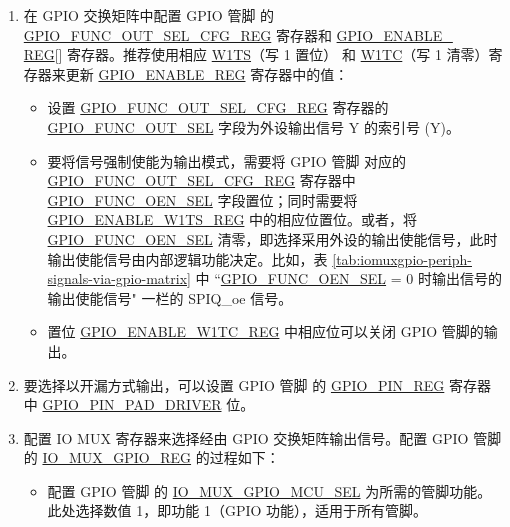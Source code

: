 \documentclass[main\_\_CN.tex]{subfiles}
\begin{document}
\begin{enumerate}
    \item 在 GPIO 交换矩阵中配置 GPIO 管脚  的 \hyperref[regdesc:GPIOFUNCNOUTSELCFGREG]{GPIO\_FUNC\_OUT\_SEL\_CFG\_REG} 寄存器和 \hyperref[regdesc:GPIOENABLEREG]{GPIO\_ENABLE\_\\REG}[] 寄存器。推荐使用相应 \hyperref[regdesc:GPIOENABLEW1TSREG]{W1TS}（写 1 置位） 和 \hyperref[regdesc:GPIOENABLEW1TCREG]{W1TC}（写 1 清零）寄存器来更新 \hyperref[regdesc:GPIOENABLEREG]{GPIO\_ENABLE\_REG} 寄存器中的值： 
    
    \begin{itemize}
        \item 设置 \hyperref[regdesc:GPIOFUNCNOUTSELCFGREG]{GPIO\_FUNC\_OUT\_SEL\_CFG\_REG} 寄存器的 \hyperref[fielddesc:GPIOFUNCNOUTSEL]{GPIO\_FUNC\_OUT\_SEL} 字段为外设输出信号 Y 的索引号 (Y)。
        \item 要将信号强制使能为输出模式，需要将 GPIO 管脚   对应的 \hyperref[regdesc:GPIOFUNCNOUTSELCFGREG]{GPIO\_FUNC\_OUT\_SEL\_CFG\_REG} 寄存器中 \hyperref[fielddesc:GPIOFUNCNOENSEL]{GPIO\_FUNC\_OEN\_SEL} 字段置位；同时需要将 \hyperref[regdesc:GPIOENABLEW1TSREG]{GPIO\_ENABLE\_W1TS\_REG} 中的相应位置位。或者，将 \hyperref[fielddesc:GPIOFUNCNOENSEL]{GPIO\_FUNC\_OEN\_SEL} 清零，即选择采用外设的输出使能信号，此时输出使能信号由内部逻辑功能决定。比如，表 \ref{tab:iomuxgpio-periph-signals-via-gpio-matrix} 中 ``\hyperref[fielddesc:GPIOFUNCNOENSEL]{GPIO\_FUNC\_OEN\_SEL} = 0 时输出信号的输出使能信号" 一栏的 SPIQ\_oe 信号。
       \item 置位 \hyperref[regdesc:GPIOENABLEW1TCREG]{GPIO\_ENABLE\_W1TC\_REG} 中相应位可以关闭 GPIO 管脚的输出。
    \end{itemize}
    \item 要选择以开漏方式输出，可以设置 GPIO 管脚  的 \hyperref[regdesc:GPIOPINNREG]{GPIO\_PIN\_REG} 寄存器中 \hyperref[fielddesc:GPIOPINNPADDRIVER]{GPIO\_PIN\_PAD\_DRIVER} 位。
    \item 配置 IO MUX 寄存器来选择经由 GPIO 交换矩阵输出信号。配置 GPIO 管脚  的 \hyperref[regdesc:IOMUXGPIONREG]{IO\_MUX\_GPIO\_REG} 的过程如下：
    \begin{itemize}
        \item 配置 GPIO 管脚  的 \hyperref[fielddesc:IOMUXGPIONMCUSEL]{IO\_MUX\_GPIO\_MCU\_SEL} 为所需的管脚功能。此处选择数值 1，即功能 1（GPIO 功能），适用于所有管脚。

\end{itemize}
\end{enumerate}
\end{document}
